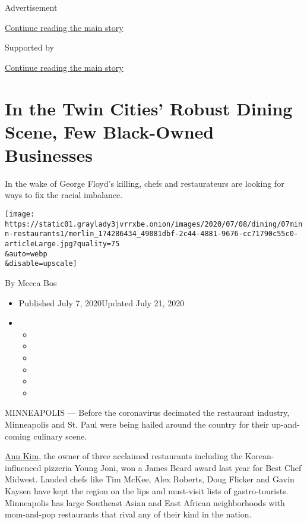 Advertisement

\protect\hyperlink{after-top}{Continue reading the main story}

Supported by

\protect\hyperlink{after-sponsor}{Continue reading the main story}

\hypertarget{in-the-twin-cities-robust-dining-scene-few-black-owned-businesses}{%
\section{In the Twin Cities' Robust Dining Scene, Few Black-Owned
Businesses}\label{in-the-twin-cities-robust-dining-scene-few-black-owned-businesses}}

In the wake of George Floyd's killing, chefs and restaurateurs are
looking for ways to fix the racial imbalance.

\texttt{[image: https://static01.graylady3jvrrxbe.onion/images/2020/07/08/dining/07minn-restaurants1/merlin\_174286434\_49081dbf-2c44-4881-9676-cc71790c55c0-articleLarge.jpg?quality=75\\\&auto=webp\\\&disable=upscale]}

By Mecca Bos

\begin{itemize}
\item
  Published July 7, 2020Updated July 21, 2020
\item
  \begin{itemize}
  \item
  \item
  \item
  \item
  \item
  \item
  \end{itemize}
\end{itemize}

MINNEAPOLIS --- Before the coronavirus decimated the restaurant
industry, Minneapolis and St. Paul were being hailed around the country
for their up-and-coming culinary scene.

\href{https://www.nytimes3xbfgragh.onion/2019/09/10/dining/ann-kim-chef-minneapolis.html}{Ann
Kim}, the owner of three acclaimed restaurants including the
Korean-influenced pizzeria Young Joni, won a James Beard award last year
for Best Chef Midwest. Lauded chefs like Tim McKee, Alex Roberts, Doug
Flicker and Gavin Kaysen have kept the region on the lips and must-visit
lists of gastro-tourists. Minneapolis has large Southeast Asian and East
African neighborhoods with mom-and-pop restaurants that rival any of
their kind in the nation.

